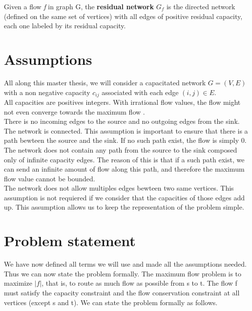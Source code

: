 \begin{definition}
\label{rnetwork}
Given a flow \textit{f} in graph G, the \textbf{residual network} $G_f$ is the directed network (defined on the same set of vertices) with all edges of positive residual capacity, each one labeled by its residual capacity.
\end{definition}


\section{Assumptions}

All along this master thesis, we will  consider a capacitated network $G = (V, E)$ with a non negative  capacity $c_{ij}$ associated with each edge $(i, j) \in E$.\\

All capacities are positives integers. With irrational flow values, the flow might not even converge towards the maximum flow \cite{Zwick1995165}.\\%

There is no incoming edges to the source and no outgoing edges from the sink. \\

The network is connected. This assumption is important to ensure that there is a path bewteen the source and the sink. If no such path exist, the flow is simply $0$.\\

The network does not contain any path from the source to the sink composed only of infinite capacity edges. The reason of this is that if a such path exist, we can send an infinite amount of flow along this path, and therefore the maximum flow value cannot be bounded. \\

The network does not allow multiples edges bewteen two same vertices. This assumption is not requiered if we consider that the capacities of those edges add up. This assumption allows us to keep the representation of the problem simple.

\section{Problem statement}

We have now defined all terms we will use and made all the assumptions needed. Thus we can now state the problem formally. The maximum flow problem is to maximize $\left\vert{f}\right\vert$, that is, to route as much flow as possible from s to t. The flow f must satisfy the capacity constraint and the flow conservation constraint at all vertices (except s and t). We can state the problem formally as follows.

